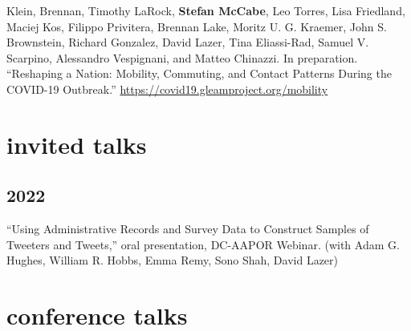 \documentclass[11pt, letter]{article}
\begin{document}
\begin{hangparas}{.25in}{1}
Klein, Brennan,\textsuperscript{\textdagger} Timothy
LaRock,\textsuperscript{\textdagger} \textbf{Stefan
  McCabe},\textsuperscript{\textdagger} Leo Torres,\textsuperscript{\textdagger}
Lisa Friedland, Maciej Kos, Filippo Privitera, Brennan Lake, Moritz U. G. Kraemer, John S.
Brownstein, Richard Gonzalez, David Lazer, Tina Eliassi-Rad, Samuel V. Scarpino, Alessandro
Vespignani, and Matteo Chinazzi. In preparation. ``Reshaping a Nation: Mobility,
Commuting, and Contact Patterns During the COVID-19 Outbreak.''
\href{https://covid19.gleamproject.org/mobility}{https://covid19.gleamproject.org/mobility} \vspace{2mm}



\end{hangparas}

\section{invited talks}
\subsection{2022}
\begin{hangparas}{.25in}{1}
  ``Using Administrative Records and Survey Data to Construct Samples
  of Tweeters and Tweets,'' oral presentation, DC-AAPOR Webinar. (with
  Adam G. Hughes, William R. Hobbs, Emma Remy, Sono Shah, David Lazer)
  \vspace{2mm}

\end{hangparas}

\vspace{2mm}
\section{conference talks}
\end{document}
